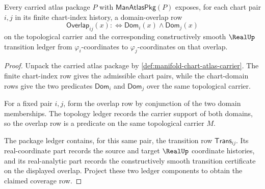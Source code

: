 \begin{theorem}
\label{thm:manifold-atlas-overlap-coverage}
Every carried atlas package $P$ with $\mathsf{ManAtlasPkg}(P)$ exposes, for
each chart pair $i,j$ in its finite chart-index history, a domain-overlap row
$$
\mathsf{Overlap}_{ij}(x)
:\Longleftrightarrow
\mathsf{Dom}_i(x)\wedge\mathsf{Dom}_j(x)
$$
on the topological carrier and the corresponding constructively smooth
$\RealUp$ transition ledger from $\varphi_i$-coordinates to
$\varphi_j$-coordinates on that overlap.
\end{theorem}
\begin{proof}
Unpack the carried atlas package by
\autoref{def:manifold-chart-atlas-carrier}. The finite chart-index row gives
the admissible chart pairs, while the chart-domain rows give the two predicates
$\mathsf{Dom}_i$ and $\mathsf{Dom}_j$ over the same topological carrier.

For a fixed pair $i,j$, form the overlap row by conjunction of the two domain
memberships. The topology ledger records the carrier support of both domains,
so the overlap row is a predicate on the same topological carrier $M$.

The package ledger contains, for this same pair, the transition row
$\mathsf{Trans}_{ij}$. Its real-coordinate part records the source and target
$\RealUp$ coordinate histories, and its real-analytic part records the
constructively smooth transition certificate on the displayed overlap. Project
these two ledger components to obtain the claimed coverage row.
\end{proof}

